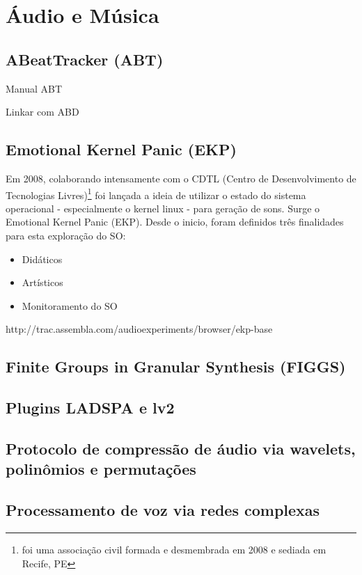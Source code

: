 \section{Áudio e Música}

\subsection{ABeatTracker (ABT)}

Manual ABT

Linkar com ABD

\subsection{Emotional Kernel Panic (EKP)}

Em 2008, colaborando intensamente com o CDTL
(Centro de Desenvolvimento de Tecnologias Livres)\footnote{foi uma associação civil formada e desmembrada em 2008 e sediada em Recife, PE}
foi lançada a ideia de utilizar o estado do sistema operacional - especialmente o kernel linux - para
geração de sons. Surge o Emotional Kernel Panic (EKP). Desde o inicio, foram definidos três finalidades
para esta exploração do SO:

\begin{itemize}
    \item Didáticos
    \item Artísticos
    \item Monitoramento do SO
\end{itemize}

http://trac.assembla.com/audioexperiments/browser/ekp-base


\subsection{Finite Groups in Granular Synthesis (FIGGS)}

\subsection{Plugins LADSPA e lv2}

\subsection{Protocolo de compressão de áudio via wavelets, polinômios e permutações}

\subsection{Processamento de voz via redes complexas}

